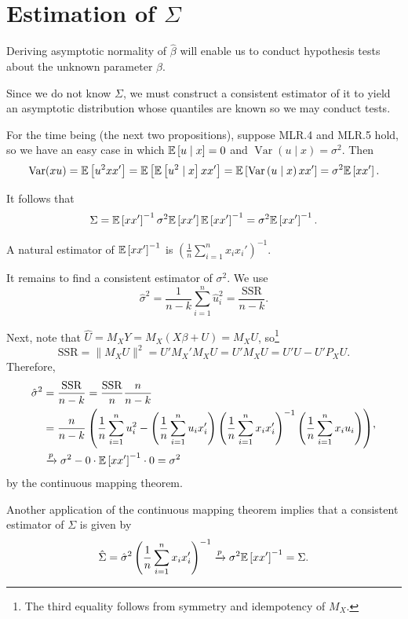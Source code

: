 \section{Estimation of $\Sigma$}

Deriving asymptotic normality of $\hat{\beta}$ will enable us to conduct hypothesis tests about the unknown parameter $\beta$.

Since we do not know $\Sigma$, we must construct a consistent estimator of it to yield an asymptotic distribution whose quantiles are known so we may conduct tests.

For the time being (the next two propositions), suppose MLR.4 and MLR.5 hold, so we have an easy case in which $\mathbb{E}\left[u \mid x\right] = 0$ and $\operatorname{Var}(u \mid x) = \sigma^2$. Then \[
	\operatorname{Var}(xu) = \mathbb{E}\left[u^2 xx'\right] = \mathbb{E}\left[\mathbb{E}\left[u^2 \mid x\right] xx'\right] = \mathbb{E}\left[\operatorname{Var}\left(u \mid x\right) x x'\right] = \sigma^2 \mathbb{E}\left[xx'\right] 
.\] 

It follows that \[
	\Sigma =  \mathbb{E}\left[x x'\right] ^{-1} \sigma^2  \mathbb{E}\left[x x'\right]  \mathbb{E}\left[x x'\right] ^{-1} = \sigma^2 \mathbb{E}\left[xx'\right] ^{-1}
.\] 


\begin{proposition}
	A natural estimator of $\mathbb{E}\left[xx'\right] ^{-1}$ is $\left( \frac{1}{n} \sum_{i=1}^{n} x_i x_i' \right)^{-1}$.
	
	It remains to find a consistent estimator of $\sigma^2$. We use \[
		\hat{\sigma}^2 = \frac{1}{n-k} \sum_{i=1}^{n} \hat{u}_i^2 = \frac{\text{SSR}}{n-k}
	.\] 
	
	Next, note that $\hat{U} = M_X Y = M_X (X\beta + U) = M_X U$, so\footnote{The third equality follows from symmetry and idempotency of $M_X$.} \[
		\text{SSR} = \|M_X U\|^2 = U' M_X' M_X U = U' M_X U = U'U - U' P_X U
	.\] 
	Therefore, \[
		\begin{aligned}
			\hat{\sigma}^2
			&= \frac{\operatorname{SSR}}{n-k}
			= \frac{\operatorname{SSR}}{n}\frac{n}{n-k} \\
			&= \frac{n}{n-k} \left( \frac{1}{n} \sum_{i=1}^{n} u_i^2 - \left( \frac{1}{n} \sum_{i=1}^{n} u_i x_i' \right) \left( \frac{1}{n} \sum_{i=1}^{n} x_i x_i' \right)^{-1} \left( \frac{1}{n} \sum_{i=1}^{n} x_i u_i \right) \right) \\
			&\xrightarrow{p} \sigma^2 - 0 \cdot \mathbb{E}\left[xx'\right]^{-1} \cdot 0
			= \sigma^2
		\end{aligned}
	,\] by the continuous mapping theorem.
	
	Another application of the continuous mapping theorem implies that a consistent estimator of $\Sigma$ is given by \[
		\hat{\Sigma} = \hat{\sigma}^2 \left( \frac{1}{n} \sum_{i=1}^{n} x_i x_i' \right)^{-1} \xrightarrow{p} \sigma^2 \mathbb{E}\left[x x'\right]^{-1} = \Sigma
	.\] 
\end{proposition}

